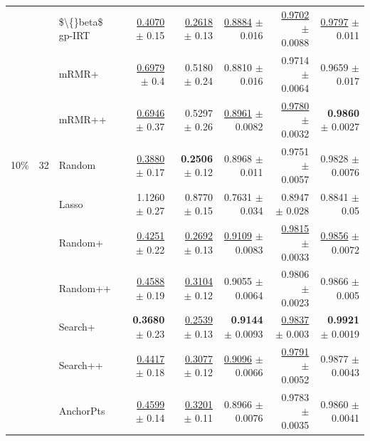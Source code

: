 \begin{longtable}{llp{}rrrrr}
 &  & \$\textbackslash\{\}beta\$ gp-IRT & \underline{0.4070} {\scriptsize $\pm$ 0.15} & \underline{0.2618} {\scriptsize $\pm$ 0.13} & \underline{0.8884} {\scriptsize $\pm$ 0.016} & \underline{0.9702} {\scriptsize $\pm$ 0.0088} & \underline{0.9797} {\scriptsize $\pm$ 0.011} \\
 &  & mRMR+ & \underline{0.6979} {\scriptsize $\pm$ 0.4} & 0.5180 {\scriptsize $\pm$ 0.24} & 0.8810 {\scriptsize $\pm$ 0.016} & 0.9714 {\scriptsize $\pm$ 0.0064} & 0.9659 {\scriptsize $\pm$ 0.017} \\
 &  & mRMR++ & \underline{0.6946} {\scriptsize $\pm$ 0.37} & 0.5297 {\scriptsize $\pm$ 0.26} & \underline{0.8961} {\scriptsize $\pm$ 0.0082} & \underline{0.9780} {\scriptsize $\pm$ 0.0032} & \textbf{0.9860} {\scriptsize $\pm$ 0.0027} \\
\midrule
10\% & 32 & Random & \underline{0.3880} {\scriptsize $\pm$ 0.17} & \textbf{0.2506} {\scriptsize $\pm$ 0.12} & 0.8968 {\scriptsize $\pm$ 0.011} & 0.9751 {\scriptsize $\pm$ 0.0057} & 0.9828 {\scriptsize $\pm$ 0.0076} \\
 &  & Lasso & 1.1260 {\scriptsize $\pm$ 0.27} & 0.8770 {\scriptsize $\pm$ 0.15} & 0.7631 {\scriptsize $\pm$ 0.034} & 0.8947 {\scriptsize $\pm$ 0.028} & 0.8841 {\scriptsize $\pm$ 0.05} \\
 &  & Random+ & \underline{0.4251} {\scriptsize $\pm$ 0.22} & \underline{0.2692} {\scriptsize $\pm$ 0.13} & \underline{0.9109} {\scriptsize $\pm$ 0.0083} & \underline{0.9815} {\scriptsize $\pm$ 0.0033} & \underline{0.9856} {\scriptsize $\pm$ 0.0072} \\
 &  & Random++ & \underline{0.4588} {\scriptsize $\pm$ 0.19} & \underline{0.3104} {\scriptsize $\pm$ 0.12} & 0.9055 {\scriptsize $\pm$ 0.0064} & 0.9806 {\scriptsize $\pm$ 0.0023} & 0.9866 {\scriptsize $\pm$ 0.005} \\
 &  & Search+ & \textbf{0.3680} {\scriptsize $\pm$ 0.23} & \underline{0.2539} {\scriptsize $\pm$ 0.13} & \textbf{0.9144} {\scriptsize $\pm$ 0.0093} & \underline{0.9837} {\scriptsize $\pm$ 0.003} & \textbf{0.9921} {\scriptsize $\pm$ 0.0019} \\
 &  & Search++ & \underline{0.4417} {\scriptsize $\pm$ 0.18} & \underline{0.3077} {\scriptsize $\pm$ 0.12} & \underline{0.9096} {\scriptsize $\pm$ 0.0066} & \underline{0.9791} {\scriptsize $\pm$ 0.0052} & 0.9877 {\scriptsize $\pm$ 0.0043} \\
 &  & AnchorPts & \underline{0.4599} {\scriptsize $\pm$ 0.14} & \underline{0.3201} {\scriptsize $\pm$ 0.11} & 0.8966 {\scriptsize $\pm$ 0.0076} & 0.9783 {\scriptsize $\pm$ 0.0035} & 0.9860 {\scriptsize $\pm$ 0.0041} \\

\end{longtable}
